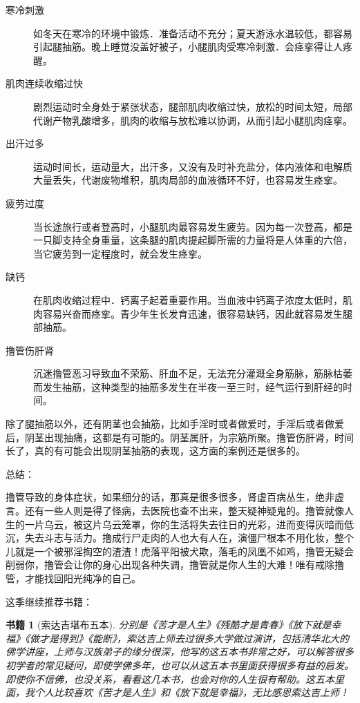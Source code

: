 \documentclass{ctexart}
\newtheorem{book}{书籍}
\begin{document}
\begin{description}
    \item[寒冷刺激] 如冬天在寒冷的环境中锻炼．准备活动不充分；夏天游泳水温较低，都容易引起腿抽筋。晚上睡觉没盖好被子，小腿肌肉受寒冷刺激．会痉挛得让人疼醒。
    \item[肌肉连续收缩过快] 剧烈运动时全身处于紧张状态，腿部肌肉收缩过快，放松的时间太短，局部代谢产物乳酸增多，肌肉的收缩与放松难以协调，从而引起小腿肌肉痉挛。
    \item[出汗过多] 运动时间长，运动量大，出汗多，又没有及时补充盐分，体内液体和电解质大量丢失，代谢废物堆积，肌肉局部的血液循环不好，也容易发生痉挛。
    \item[疲劳过度] 当长途旅行或者登高时，小腿肌肉最容易发生疲劳。因为每一次登高，都是一只脚支持全身重量，这条腿的肌肉提起脚所需的力量将是人体重的六倍，当它疲劳到一定程度时，就会发生痉挛。
    \item[缺钙] 在肌肉收缩过程中．钙离子起着重要作用。当血液中钙离子浓度太低时，肌肉容易兴奋而痉挛。青少年生长发育迅速，很容易缺钙，因此就容易发生腿部抽筋。
    \item[撸管伤肝肾] 沉迷撸管恶习导致血不荣筋、肝血不足，无法充分灌溉全身筋脉，筋脉枯萎而发生抽筋，这种类型的抽筋多发生在半夜一至三时，经气运行到肝经的时间。
\end{description}

除了腿抽筋以外，还有阴茎也会抽筋，比如手淫时或者做爱时，手淫后或者做爱后，阴茎出现抽痛，这都是有可能的。阴茎属肝，为宗筋所聚。撸管伤肝肾，时间长了，真的有可能会出现阴茎抽筋的表现，这方面的案例还是很多的。

总结：

撸管导致的身体症状，如果细分的话，那真是很多很多，肾虚百病丛生，绝非虚言。还有一些人则是得了怪病，去医院也查不出来，整天疑神疑鬼的。撸管就像人生的一片乌云，被这片乌云笼罩，你的生活将失去往日的光彩，进而变得灰暗而低沉，失去斗志与活力。撸成行尸走肉的人也大有人在，演僵尸根本不用化妆，整个儿就是一个被邪淫掏空的渣渣！虎落平阳被犬欺，落毛的凤凰不如鸡，撸管无疑会削弱你，撸管会让你的身心出现各种失调，撸管就是你人生的大难！唯有戒除撸管，才能找回阳光纯净的自己。

这季继续推荐书籍：

\begin{book}[索达吉堪布五本]
    分别是《苦才是人生》《残酷才是青春》《放下就是幸福》《做才是得到》《能断》，索达吉上师去过很多大学做过演讲，包括清华北大的佛学讲座，上师与汉族弟子的缘分很深，他写的这五本书非常之好，可以解答很多初学者的常见疑问，即使学佛多年，也可以从这五本书里面获得很多有益的启发。即使你不信佛，也没关系，看看这几本书，也会对你的人生很有帮助。这五本里面，我个人比较喜欢《苦才是人生》和《放下就是幸福》，无比感恩索达吉上师！
\end{book}
\end{document}

